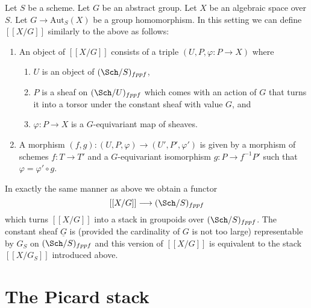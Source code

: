\begin{remark}
\label{remark-X-mod-G-group}
Let $S$ be a scheme.
Let $G$ be an abstract group.
Let $X$ be an algebraic space over $S$.
Let $G \to \text{Aut}_S(X)$ be a group homomorphism.
In this setting we can define $[[X/G]]$ similarly
to the above as follows:
\begin{enumerate}
\item An object of $[[X/G]]$ consists of a triple
$(U, P, \varphi : P \to X)$ where
\begin{enumerate}
\item $U$ is an object of $(\Sch/S)_{fppf}$,
\item $P$ is a sheaf on $(\Sch/U)_{fppf}$ which comes
with an action of $G$ that turns it into a torsor under the constant
sheaf with value $G$, and
\item $\varphi : P \to X$ is a $G$-equivariant map of sheaves.
\end{enumerate}
\item A morphism
$(f, g) : (U, P, \varphi) \to (U', P', \varphi')$
is given by a morphism of schemes $f : T \to T'$
and a $G$-equivariant isomorphism
$g : P \to f^{-1}P'$ such that $\varphi = \varphi' \circ g$.
\end{enumerate}
In exactly the same manner as above we obtain a functor
$$
[[X/G]] \longrightarrow (\Sch/S)_{fppf}
$$
which turns $[[X/G]]$ into a stack in groupoids over $(\Sch/S)_{fppf}$.
The constant sheaf $\underline{G}$ is (provided the cardinality of $G$ is
not too large) representable by $G_S$ on $(\Sch/S)_{fppf}$
and this version of $[[X/G]]$ is equivalent to the stack
$[[X/G_S]]$ introduced above.
\end{remark}






\section{The Picard stack}
\label{section-picard-stack}


